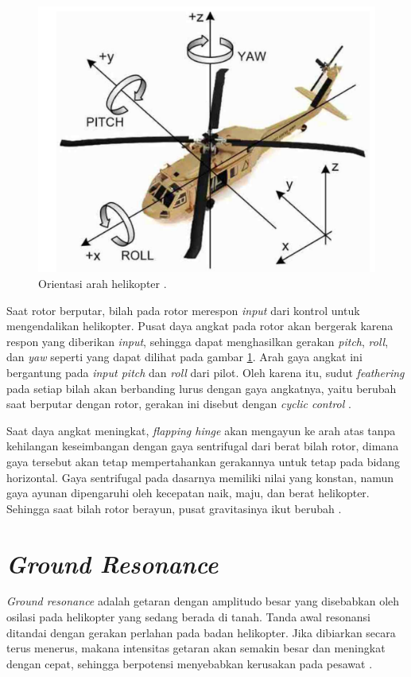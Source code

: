 \begin{figure}[H]
	\centering
	\includegraphics[width=0.65\linewidth]{gambar/roll-pitch-yaw.png}
	\caption{Orientasi arah helikopter \cite{Jhwang}.}
	\label{fig:orientasiheli}
\end{figure}

Saat rotor berputar, bilah pada rotor merespon \textit{input} dari kontrol untuk mengendalikan helikopter. Pusat daya angkat pada rotor akan bergerak karena respon yang diberikan \textit{input}, sehingga dapat menghasilkan gerakan \textit{pitch}, \textit{roll}, dan \textit{yaw} seperti yang dapat dilihat pada gambar \ref{fig:orientasiheli}. Arah gaya angkat ini bergantung pada \textit{input pitch} dan \textit{roll} dari pilot. Oleh karena itu, sudut \textit{feathering} pada setiap bilah akan berbanding lurus dengan gaya angkatnya, yaitu berubah saat berputar dengan rotor, gerakan ini disebut dengan \textit{cyclic control} \cite{handbook}.

Saat daya angkat meningkat, \textit{flapping hinge} akan mengayun ke arah atas tanpa kehilangan keseimbangan dengan gaya sentrifugal dari berat bilah rotor, dimana gaya tersebut akan tetap mempertahankan gerakannya untuk tetap pada bidang horizontal. Gaya sentrifugal pada dasarnya memiliki nilai yang konstan, namun gaya ayunan dipengaruhi oleh kecepatan naik, maju, dan berat helikopter. Sehingga saat bilah rotor berayun, pusat gravitasinya ikut berubah \cite{handbook}.

\section{\textit{Ground Resonance}}
\label{sec:groundresonance}

\textit{Ground resonance} adalah getaran dengan amplitudo besar yang disebabkan oleh osilasi pada helikopter yang sedang berada di tanah. Tanda awal resonansi ditandai dengan gerakan perlahan pada badan helikopter. Jika dibiarkan secara terus menerus, makana intensitas getaran akan semakin besar dan meningkat dengan cepat, sehingga berpotensi menyebabkan kerusakan pada pesawat \cite{wagtendonk2006principles}.

